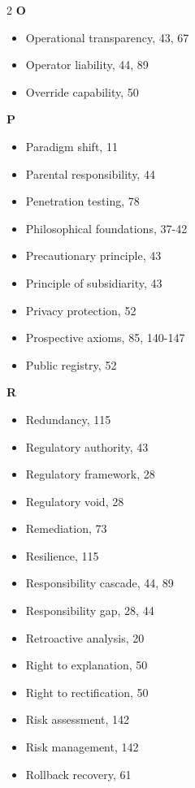 \begin{multicols}{2}
\textbf{O}
\begin{itemize}[leftmargin=0.5cm]
\item Operational transparency, 43, 67
\item Operator liability, 44, 89
\item Override capability, 50
\end{itemize}

\textbf{P}
\begin{itemize}[leftmargin=0.5cm]
\item Paradigm shift, 11
\item Parental responsibility, 44
\item Penetration testing, 78
\item Philosophical foundations, 37-42
\item Precautionary principle, 43
\item Principle of subsidiarity, 43
\item Privacy protection, 52
\item Prospective axioms, 85, 140-147
\item Public registry, 52
\end{itemize}

\textbf{R}
\begin{itemize}[leftmargin=0.5cm]
\item Redundancy, 115
\item Regulatory authority, 43
\item Regulatory framework, 28
\item Regulatory void, 28
\item Remediation, 73
\item Resilience, 115
\item Responsibility cascade, 44, 89
\item Responsibility gap, 28, 44
\item Retroactive analysis, 20
\item Right to explanation, 50
\item Right to rectification, 50
\item Risk assessment, 142
\item Risk management, 142
\item Rollback recovery, 61
\end{itemize}


\end{multicols}
